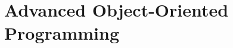 % 

% 

% 

\chapter{Advanced Object-Oriented Programming}
\thispagestyle{chapterstart}
\pagestyle{otherpages}
\label{chapter-advanced-oop}
\setcounter{excounter}{1}
\setcounter{examplecounter}{1}


% 

% 

